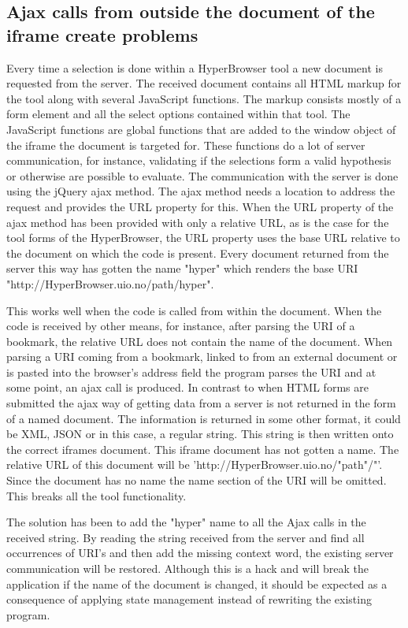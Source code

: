 \documentclass[english]{ifimaster}
\begin{document}
\subsection{Ajax calls from outside the document of the iframe create problems} 
\label{sec:ajaxOutsidIframe}
Every time a selection is done within a HyperBrowser tool a new document is requested from the server. The received document contains all HTML markup for the tool along with several JavaScript functions. The markup consists mostly of a form element and all the select options contained within that tool. The JavaScript functions are global functions that are added to the window object of the iframe the document is targeted for. These functions do a lot of server communication, for instance, validating if the selections form a valid hypothesis or otherwise are possible to evaluate. The communication with the server is done using the jQuery ajax method. The ajax method needs a location to address the request and provides the URL property for this. When the URL property of the ajax method has been provided with only a relative URL, as is the case for the tool forms of the HyperBrowser, the URL property uses the base URL relative to the document on which the code is present. Every document returned from the server this way has gotten the name "hyper" which renders the base URI "http://HyperBrowser.uio.no/path/hyper". 

This works well when the code is called from within the document. When the code is received by other means, for instance, after parsing the URI of a bookmark, the relative URL does not contain the name of the document. When parsing a URI coming from a bookmark, linked to from an external document or is pasted into the browser's address field the program parses the URI and at some point, an ajax call is produced. In contrast to when HTML forms are submitted the ajax way of getting data from a server is not returned in the form of a named document. The information is returned in some other format, it could be XML, JSON or in this case, a regular string. This string is then written onto the correct iframes document. This iframe document has not gotten a name. The relative URL of this document will be 'http://HyperBrowser.uio.no/"path"/"'. Since the document has no name the name section of the URI will be omitted. This breaks all the tool functionality.

The solution has been to add the "hyper" name to all the Ajax calls in the received string. By reading the string received from the server and find all occurrences of URI's and then add the missing context word, the existing server communication will be restored. Although this is a hack and will break the application if the name of the document is changed, it should be expected as a consequence of applying state management instead of rewriting the existing program. 
\end{document}
